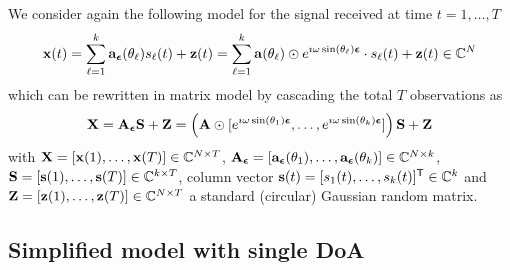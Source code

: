 \documentclass[11pt,a4paper]{article}
\begin{document}
We consider again the following model for the signal received at time $t= 1,\ldots, T$
\begin{equation}
	\mathbf{x}(t) = \sum_{\ell = 1}^k \mathbf{a}_{{\boldsymbol{\epsilon}}}(\theta_\ell) s_\ell(t) + \mathbf{z}(t) = \sum_{\ell = 1}^k \mathbf{a}(\theta_\ell) \odot e^{\imath \omega \sin(\theta_\ell) {\boldsymbol{\epsilon}} } \cdot s_\ell(t) + \mathbf{z}(t) \in {\mathbb{C}}^N
\end{equation}
which can be rewritten in matrix model by cascading the total $T$ observations as  
\begin{equation}
	{\mathbf{X}} = {\mathbf{A}}_{{\boldsymbol{\epsilon}}} {\mathbf{S}} + {\mathbf{Z}} = \left( {\mathbf{A}} \odot [e^{\imath \omega \sin(\theta_1) {\boldsymbol{\epsilon}} }, \ldots, e^{\imath \omega \sin(\theta_k) {\boldsymbol{\epsilon}} }] \right) {\mathbf{S}} + {\mathbf{Z}}
\end{equation}
with ${\mathbf{X}} = [\mathbf{x}(1), \ldots, \mathbf{x}(T)] \in {\mathbb{C}}^{N \times T}$, ${\mathbf{A}}_{{\boldsymbol{\epsilon}}} = [\mathbf{a}_{{\boldsymbol{\epsilon}}}(\theta_1), \ldots, \mathbf{a}_{{\boldsymbol{\epsilon}}}(\theta_k)] \in {\mathbb{C}}^{N \times k}$, ${\mathbf{S}} = [\mathbf{s}(1), \ldots, \mathbf{s}(T)] \in {\mathbb{C}}^{k \times T}$, column vector $\mathbf{s}(t) = [s_1(t), \ldots, s_k(t)]^{\sf T} \in {\mathbb{C}}^k$ and ${\mathbf{Z}} = [\mathbf{z}(1), \ldots, \mathbf{z}(T)] \in {\mathbb{C}}^{N \times T}$ a standard (circular) Gaussian random matrix.

\subsection{Simplified model with single DoA}
\end{document}
